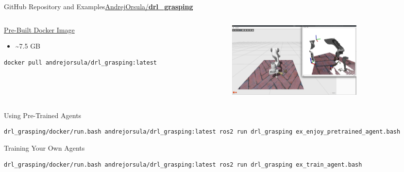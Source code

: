 \begin{frame}[fragile]{GitHub Repository and Examples}{\href{https://github.com/AndrejOrsula/drl_grasping}{AndrejOrsula/\textbf{drl\_grasping}}}
    \vspace{-0.3cm}

    \begin{columns}%
        \begin{column}{0.325\textwidth}%
            \begin{block}{\href{https://hub.docker.com/repository/docker/andrejorsula/drl_grasping}{Pre-Built Docker Image}}
                {\scriptsize%
                    \begin{itemize}
                        \item \textasciitilde7.5 GB
                    \end{itemize}
                }%
                \begin{lstlisting}[language=bash,basicstyle=\tiny,stepnumber=1,numbersep=10pt,tabsize=4,showspaces=false,showstringspaces=false]
        docker pull andrejorsula/drl_grasping:latest
                \end{lstlisting}
            \end{block}
        \end{column}
        \begin{column}{0.6\textwidth}%
            \centering
            \includegraphics[height=3.8cm]{graphics/pre_trained_agent_example.png}
        \end{column}
    \end{columns}

    \begin{block}{Using Pre-Trained Agents}
        \begin{lstlisting}[language=bash,basicstyle=\tiny,stepnumber=1,numbersep=10pt,tabsize=4,showspaces=false,showstringspaces=false]
        drl_grasping/docker/run.bash andrejorsula/drl_grasping:latest ros2 run drl_grasping ex_enjoy_pretrained_agent.bash
        \end{lstlisting}
    \end{block}

    \vspace{0.5cm}

    \begin{block}{Training Your Own Agents}
        \begin{lstlisting}[language=bash,basicstyle=\tiny,stepnumber=1,numbersep=10pt,tabsize=4,showspaces=false,showstringspaces=false]
        drl_grasping/docker/run.bash andrejorsula/drl_grasping:latest ros2 run drl_grasping ex_train_agent.bash
        \end{lstlisting}
    \end{block}
\end{frame}
